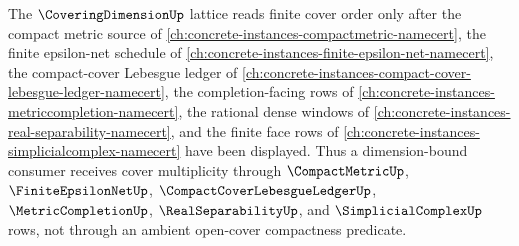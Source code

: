 The $\CoveringDimensionUp$ lattice reads finite cover order only after the compact metric source of \autoref{ch:concrete-instances-compactmetric-namecert}, the finite epsilon-net schedule of \autoref{ch:concrete-instances-finite-epsilon-net-namecert}, the compact-cover Lebesgue ledger of \autoref{ch:concrete-instances-compact-cover-lebesgue-ledger-namecert}, the completion-facing rows of \autoref{ch:concrete-instances-metriccompletion-namecert}, the rational dense windows of \autoref{ch:concrete-instances-real-separability-namecert}, and the finite face rows of \autoref{ch:concrete-instances-simplicialcomplex-namecert} have been displayed. Thus a dimension-bound consumer receives cover multiplicity through $\CompactMetricUp$, $\FiniteEpsilonNetUp$, $\CompactCoverLebesgueLedgerUp$, $\MetricCompletionUp$, $\RealSeparabilityUp$, and $\SimplicialComplexUp$ rows, not through an ambient open-cover compactness predicate.
